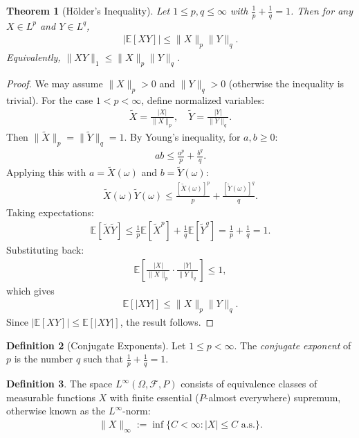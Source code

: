 \documentclass[11pt,reqno]{amsart}
\newtheorem{theorem}{Theorem}[section]
\theoremstyle{definition}
\newtheorem{definition}[theorem]{Definition}
\theoremstyle{remark}
\begin{document}
\begin{theorem}[Hölder's Inequality]
	Let $1 \leq p, q \leq \infty$ with $\frac{1}{p} + \frac{1}{q} = 1$. Then for any $X \in L^p$ and $Y \in L^q$,
	\begin{align*}
		|\mathbb{E}[XY]| \leq \|X\|_p \|Y\|_q.
	\end{align*}
	Equivalently, $\|XY\|_1 \leq \|X\|_p \|Y\|_q$.
\end{theorem}

\begin{proof}
	We may assume $\|X\|_p > 0$ and $\|Y\|_q > 0$ (otherwise the inequality is trivial). For the case $1 < p < \infty$, define normalized variables:
	\begin{align*}
		\tilde{X} = \frac{|X|}{\|X\|_p}, \quad \tilde{Y} = \frac{|Y|}{\|Y\|_q}.
	\end{align*}
	Then $\|\tilde{X}\|_p = \|\tilde{Y}\|_q = 1$. By Young's inequality, for $a, b \geq 0$:
	\begin{align*}
		ab \leq \frac{a^p}{p} + \frac{b^q}{q}.
	\end{align*}
	Applying this with $a = \tilde{X}(\omega)$ and $b = \tilde{Y}(\omega)$:
	\begin{align*}
		\tilde{X}(\omega) \tilde{Y}(\omega) \leq \frac{[\tilde{X}(\omega)]^p}{p} + \frac{[\tilde{Y}(\omega)]^q}{q}.
	\end{align*}
	Taking expectations:
	\begin{align*}
		\mathbb{E}[\tilde{X} \tilde{Y}] \leq \frac{1}{p}\mathbb{E}[\tilde{X}^p] + \frac{1}{q}\mathbb{E}[\tilde{Y}^q] = \frac{1}{p} + \frac{1}{q} = 1.
	\end{align*}
	Substituting back:
	\begin{align*}
		\mathbb{E}\left[\frac{|X|}{\|X\|_p} \cdot \frac{|Y|}{\|Y\|_q}\right] \leq 1,
	\end{align*}
	which gives
	\begin{align*}
		\mathbb{E}[|XY|] \leq \|X\|_p \|Y\|_q.
	\end{align*}
	Since $|\mathbb{E}[XY]| \leq \mathbb{E}[|XY|]$, the result follows.
\end{proof}

\begin{definition}[Conjugate Exponents]
	Let $1 \leq p < \infty$. The \emph{conjugate exponent} of $p$ is the number $q$ such that $\frac{1}{p} + \frac{1}{q} = 1$.
\end{definition}

\begin{definition}
	The space \(L^\infty(\Omega, \mathcal{F}, P)\) consists of equivalence classes of measurable functions $X$ with finite essential (\(P\)-almost everywhere) supremum, otherwise known as the \(L^\infty\)-norm:
	\begin{align*}
		\|X\|_\infty := \inf \{C < \infty : |X| \leq C \text{ a.s.}\}.
	\end{align*}
\end{definition}
\end{document}

